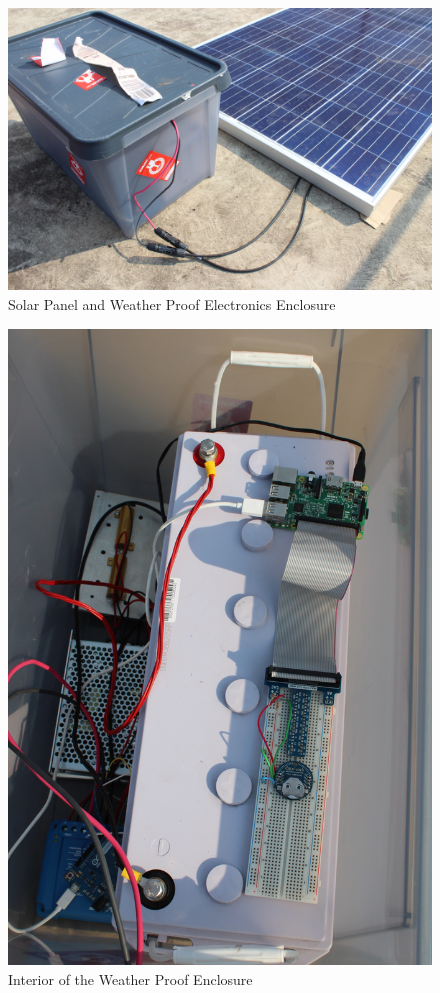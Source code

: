 \documentclass[12pt,a4paper]{report}
\begin{document}
\begin{figure}[h!]
	\begin{center}
		\includegraphics[width=0.8\linewidth]{Figures/rooftop1.JPG}
		\caption{Solar Panel and Weather Proof Electronics Enclosure}
		\label{Fig:Rooftop1}
	\end{center}
\end{figure}

\begin{figure}[h!]
	\begin{center}
		\includegraphics[width=1\linewidth]{Figures/rooftop2.JPG}
		\caption{Interior of the Weather Proof Enclosure}
		\label{Fig:Rooftop2}
	\end{center}
\end{figure}
\end{document}
